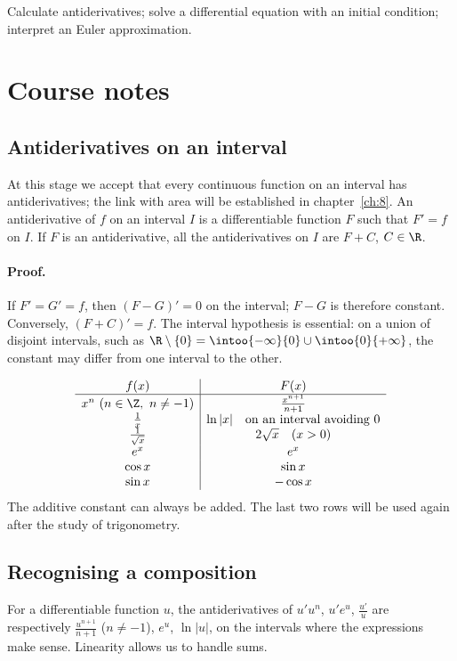 \label{ch:7}


\begin{keypoint}[Objectives]Calculate antiderivatives; solve a differential equation with an initial condition; interpret an Euler approximation.\end{keypoint}

\section{Course notes}
\subsection{Antiderivatives on an interval}
At this stage we accept that every continuous function on an interval has antiderivatives; the link with area will be established in chapter~\ref{ch:8}.
An antiderivative of $f$ on an interval $I$ is a differentiable function $F$ such that $F'=f$ on $I$. If $F$ is an antiderivative, all the antiderivatives on $I$ are $F+C$, $C\in\R$.
\paragraph{Proof.} If $F'=G'=f$, then $(F-G)'=0$ on the interval; $F-G$ is therefore constant. Conversely, $(F+C)'=f$. The interval hypothesis is essential: on a union of disjoint intervals, such as $\R\setminus\{0\}=\intoo{-\infty}{0}\cup\intoo{0}{+\infty}$, the constant may differ from one interval to the other.
\begin{keypoint}
\[\begin{array}{c|c}
f(x)&F(x)\\\hline
x^n\ (n\in\Z,\ n\ne-1)&\frac{x^{n+1}}{n+1}\\
\frac{1}{x}&\ln|x|\quad\text{on an interval avoiding }0\\
\frac{1}{\sqrt{x}}&2\sqrt{x}\quad(x>0)\\
e^x&e^x\\
\cos x&\sin x\\
\sin x&-\cos x
\end{array}\]
The additive constant can always be added. The last two rows will be used again after the study of trigonometry.
\end{keypoint}
\subsection{Recognising a composition}
For a differentiable function $u$, the antiderivatives of $u'u^n$, $u'e^u$, $\frac{u'}{u}$ are respectively $\frac{u^{n+1}}{n+1}$ ($n\ne-1$), $e^u$, $\ln|u|$, on the intervals where the expressions make sense. Linearity allows us to handle sums.
